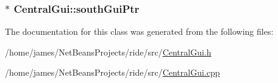 \hypertarget{class_central_gui_ae7012a7f0abe1fea596ce6af795c1741}{
\subsubsection[{south\-Gui\-Ptr}]{$\ast$ Central\-Gui\-::south\-Gui\-Ptr\hspace{0.3cm}{\ttfamily [private]}}}\label{class_central_gui_ae7012a7f0abe1fea596ce6af795c1741}


The documentation for this class was generated from the following files\-:\begin{DoxyCompactItemize}
\item 
/home/james/\-Net\-Beans\-Projects/ride/src/\hyperlink{_central_gui_8h}{Central\-Gui.\-h}\item 
/home/james/\-Net\-Beans\-Projects/ride/src/\hyperlink{_central_gui_8cpp}{Central\-Gui.\-cpp}\end{DoxyCompactItemize}
